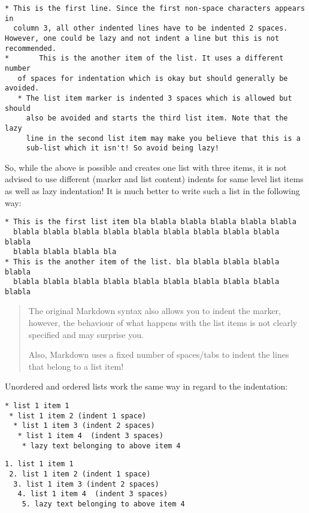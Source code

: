 \documentclass[a4paper]{article}
\begin{document}
\begin{verbatim}
* This is the first line. Since the first non-space characters appears in
  column 3, all other indented lines have to be indented 2 spaces.
However, one could be lazy and not indent a line but this is not
recommended.
*       This is the another item of the list. It uses a different number
   of spaces for indentation which is okay but should generally be avoided.
   * The list item marker is indented 3 spaces which is allowed but should
     also be avoided and starts the third list item. Note that the lazy
     line in the second list item may make you believe that this is a
     sub-list which it isn't! So avoid being lazy!
\end{verbatim}

So, while the above is possible and creates one list with three items,
it is not advised to use different (marker and list content) indents for
same level list items as well as lazy indentation! It is much better to
write such a list in the following way:

\begin{verbatim}
* This is the first list item bla blabla blabla blabla blabla blabla
  blabla blabla blabla blabla blabla blabla blabla blabla blabla blabla
  blabla blabla blabla bla
* This is the another item of the list. bla blabla blabla blabla blabla
  blabla blabla blabla blabla blabla blabla blabla blabla blabla blabla
\end{verbatim}

\begin{quote}
The original Markdown syntax also allows you to indent the marker,
however, the behaviour of what happens with the list items is not
clearly specified and may surprise you.

Also, Markdown uses a fixed number of spaces/tabs to indent the lines
that belong to a list item!
\end{quote}

Unordered and ordered lists work the same way in regard to the
indentation:

\begin{verbatim}
* list 1 item 1
 * list 1 item 2 (indent 1 space)
  * list 1 item 3 (indent 2 spaces)
   * list 1 item 4  (indent 3 spaces)
    * lazy text belonging to above item 4
\end{verbatim}

\begin{verbatim}
1. list 1 item 1
 2. list 1 item 2 (indent 1 space)
  3. list 1 item 3 (indent 2 spaces)
   4. list 1 item 4  (indent 3 spaces)
    5. lazy text belonging to above item 4
\end{verbatim}
\end{document}

